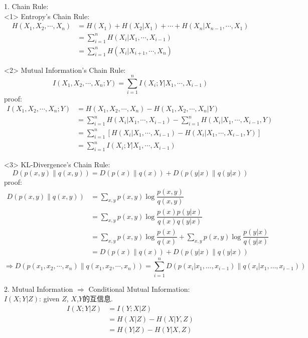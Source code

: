 \begin{proposition}
1. Chain Rule:\\
<1> Entropy's Chain Rule:
\begin{align*}
H(X_1,X_2,\cdots,X_n) &= H(X_1) + H(X_2|X_1) + \cdots + H(X_n|X_{n-1},\cdots,X_1) \\
&= \sum_{i=1}^{n}H(X_i|X_1,\cdots,X_{i-1}) \\
&= \sum_{i=1}^{n}H(X_i|X_{i+1},\cdots,X_{n})
\end{align*}

<2> Mutual Information's Chain Rule:
$$I(X_1,X_2,\cdots,X_n;Y)=\sum_{i=1}^{n}I(X_i;Y|X_1,\cdots,X_{i-1})$$
proof:
\begin{align*}
I(X_1,X_2,\cdots,X_n;Y) &= H(X_1,X_2,\cdots,X_n) - H(X_1,X_2,\cdots,X_n|Y) \\
&= \sum_{i=1}^{n}H(X_i|X_1,\cdots,X_{i-1}) - \sum_{i=1}^{n}H(X_i|X_1,\cdots,X_{i-1},Y) \\
&= \sum_{i=1}^{n}\left[H(X_i|X_1,\cdots,X_{i-1})-H(X_i|X_1,\cdots,X_{i-1},Y)\right] \\
&= \sum_{i=1}^{n}I(X_i;Y|X_1,\cdots,X_{i-1})
\end{align*}

<3> KL-Divergence's Chain Rule:
$$D\left(p(x,y)\|q(x,y)\right)=D\left(p(x)\|q(x)\right) + D\left(p(y|x)\|q(y|x)\right)$$
proof:
\begin{align*}
D\left(p(x,y)\|q(x,y)\right) &= \sum_{x,y}p(x,y)\log\dfrac{p(x,y)}{q(x,y)} \\
&= \sum_{x,y}p(x,y)\log\dfrac{p(x)p(y|x)}{q(x)q(y|x)} \\
&= \sum_{x,y}p(x,y)\log\dfrac{p(x)}{q(x)} + \sum_{x,y}p(x,y)\log\dfrac{p(y|x)}{q(y|x)} \\
&= D\left(p(x)\|q(x)\right) + D\left(p(y|x)\|q(y|x)\right)
\end{align*}
$$\Rightarrow D\left(p(x_1,x_2,\cdots,x_n)\|q(x_1,x_2,\cdots,x_n)\right)=\sum_{i=1}^{n}D\left(p(x_i|x_1,\ldots,x_{i-1})\|q(x_i|x_1,\ldots,x_{i-1})\right)$$


2. Mutual Information $\Rightarrow$ Conditional Mutual Information:\\
$I(X;Y|Z)$: given $Z$, $X$,$Y$的互信息.
\begin{align*}
    I(X;Y|Z) &= I(Y;X|Z) \\
    &= H(X|Z) - H(X|Y,Z) \\
    &= H(Y|Z) - H(Y|X,Z)
\end{align*}
\end{proposition}

